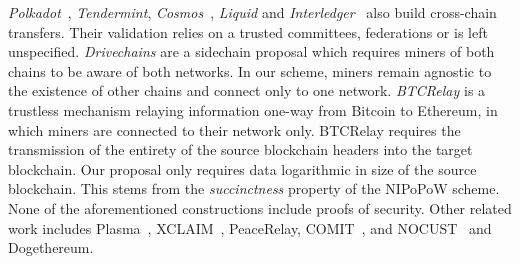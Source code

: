 \emph{Polkadot}~\cite{wood2016polkadot}, \emph{Tendermint},
\emph{Cosmos}~\cite{buchman2016tendermint}, \emph{Liquid} and
\emph{Interledger}~\cite{interledger} also build cross-chain transfers. Their
validation relies on a trusted committees, federations or is left unspecified.
\emph{Drivechains} are a sidechain proposal which requires miners of both chains
to be aware of both networks. In our scheme, miners remain agnostic to the
existence of other chains and connect only to one network. \emph{BTCRelay} is a
trustless mechanism relaying information one-way from Bitcoin to Ethereum, in
which miners are connected to their network only. BTCRelay requires the
transmission of the entirety of the source blockchain headers into the target
blockchain. Our proposal only requires data logarithmic in size of the source
blockchain. This stems from the \emph{succinctness} property of the NIPoPoW
scheme. None of the aforementioned constructions include proofs of security.
Other related work includes Plasma~\cite{poon2017plasma},
XCLAIM~\cite{zamyatinxclaim}, PeaceRelay, COMIT~\cite{comit}, and
NOCUST~\cite{khalil2018nocust} and Dogethereum.
